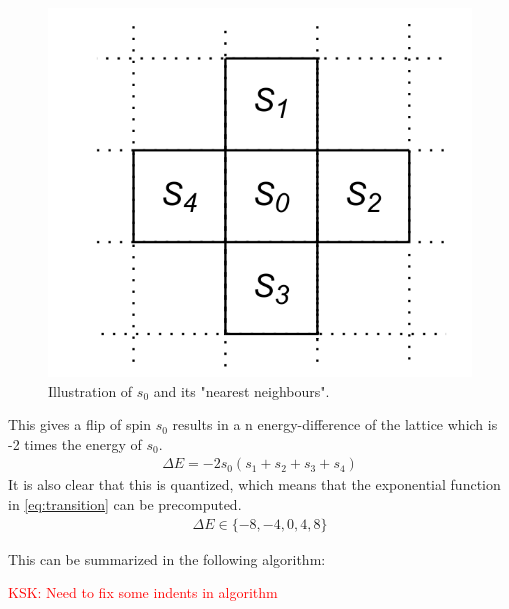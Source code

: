 \documentclass[11pt,a4paper,english]{article}
\numberwithin{equation}{section}
\begin{document}
\begin{figure}[H]
\centering
\includegraphics[scale=0.2]{pics/full_lattice.png}
\caption{ Illustration of $s_0$ and its "nearest neighbours".}
\label{fig:spin_neighbours}
\end{figure}

This gives a flip of spin $s_0$ results in a n
energy-difference of the lattice which is
 -2 times the energy of $s_0$.
\begin{gather}
\Delta E = -2s_0(s_1 + s_2 + s_3 + s_4)
\end{gather}
It is also clear that this is quantized, which means that the 
exponential function in \eqref{eq:transition} can be precomputed.
\begin{gather}
\Delta E \in \{-8,-4,0,4,8\}
\end{gather}

This can be summarized in the following algorithm:

\textcolor{red}{KSK: Need to fix some indents in algorithm}
\end{document}
